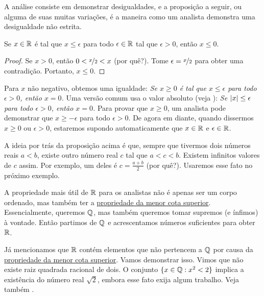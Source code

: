 A análise consiste em demonstrar desigualdades, e
a proposição a seguir, ou alguma de suas muitas variações,
é a maneira como um analista demonstra uma desigualdade não estrita.

\begin{prop}
Se $x \in {\mathbb{R}}$ é tal que $x \leq \epsilon$ para todo
$\epsilon \in {\mathbb{R}}$ tal que
$\epsilon > 0$, então $x \leq 0$.
\end{prop}

\begin{proof}
Se $x > 0$, então $0 < \nicefrac{x}{2} < x$ (por quê?). Tome
$\epsilon = \nicefrac{x}{2}$ para obter uma contradição. Portanto, $x \leq 0$.
\end{proof}

Para $x$ não negativo, obtemos uma igualdade:
\emph{Se $x \geq 0$ é tal que $x \leq \epsilon$ para todo
$\epsilon > 0$, então $x = 0$.}
Uma versão comum usa o valor absoluto (veja ):
\emph{Se $\lvert {x} \rvert \leq \epsilon$ para todo
$\epsilon > 0$, então $x = 0$.}
Para provar que $x \geq 0$, um analista pode demonstrar
que $x \geq -\epsilon$ para todo $\epsilon > 0$.
De agora em diante, quando dissermos $x \geq 0$ ou
$\epsilon > 0$, estaremos supondo automaticamente que $x \in {\mathbb{R}}$ e $\epsilon \in {\mathbb{R}}$.

A ideia por trás da proposição acima é que, sempre que tivermos dois números
reais $a < b$, existe outro
número real $c$ tal que
$a < c < b$. Existem infinitos valores de $c$ assim. Por exemplo, um deles é
$c = \frac{a+b}{2}$ (por quê?).
Usaremos esse fato no próximo exemplo.

A propriedade mais útil de ${\mathbb{R}}$ para os analistas
não é apenas ser um corpo ordenado, mas também ter a
\hyperref[defn:lub]{propriedade da menor cota superior}.
Essencialmente, queremos ${\mathbb{Q}}$, mas também queremos
tomar supremos (e ínfimos) à vontade.
Então partimos de ${\mathbb{Q}}$ e acrescentamos números suficientes para obter ${\mathbb{R}}$.

Já mencionamos que ${\mathbb{R}}$ contém elementos que não pertencem a ${\mathbb{Q}}$
por causa da \hyperref[defn:lub]{propriedade da menor cota superior}. Vamos
demonstrar isso.
Vimos que não existe raiz quadrada racional de dois. O conjunto
$\{ x \in {\mathbb{Q}} : x^2 < 2 \}$ implica a existência do número real
$\sqrt{2}$, embora esse fato exija algum trabalho. Veja também
.

